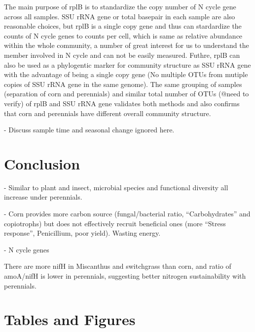 \documentclass[12pt]{article}
\begin{document}
{The main purpose of rplB is to standardize the copy number of N cycle gene across all samples. SSU rRNA gene or total basepair in each sample are also reasonable choices, but rplB is a single copy gene and thus can stardardize the counts of N cycle genes to counts per cell, which is same as relative abundance within the whole community, a number of great interest for us to understand the member involved in N cycle and can not be easily measured. Futhre, rplB can also be used as a phylogentic marker for community structure as SSU rRNA gene with the advantage of being a single copy gene (No multiple OTUs from mutiple copies of SSU rRNA gene in the same genome). The same grouping of samples (separation of corn and perennials) and similar total number of OTUs (@need to verify) of rplB and SSU rRNA gene validates both methods and also confirms that corn and perennials have different overall community structure.

- Discuss sample time and seasonal change ignored here. 

\section{Conclusion}

- Similar to plant and insect, microbial species and functional diversity all increase under perennials.

- Corn provides more carbon source (fungal/bacterial ratio, ``Carbohydrates'' and copiotrophs) but does not effectively recruit beneficial ones (more ``Stress response'', Penicillium, poor yield). Wasting energy.

- N cycle genes

There are more nifH in Miscanthus and switchgrass than corn, and ratio of amoA/nifH is lower in perennials, suggesting better nitrogen sustainability with perennials.

\section{Tables and Figures}

}
\end{document}
